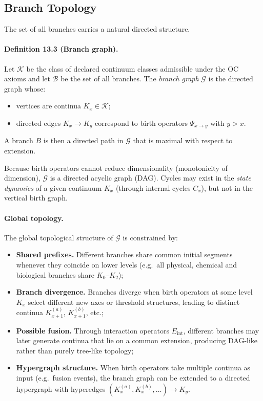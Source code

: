 \subsection{Branch Topology}

The set of all branches carries a natural directed structure.

\paragraph{Definition 13.3 (Branch graph).}
Let \(\mathcal{K}\) be the class of declared continuum classes admissible under the OC
axioms and let \(\mathcal{B}\) be the set of all branches. The
\emph{branch graph} \(\mathcal{G}\) is the directed graph whose:
\begin{itemize}
  \item vertices are continua \(K_x\in\mathcal{K}\);
  \item directed edges \(K_x \to K_y\) correspond to birth operators
        \(\Psi_{x\to y}\) with \(y > x\).
\end{itemize}
A branch \(B\) is then a directed path in \(\mathcal{G}\) that is maximal
with respect to extension.

Because birth operators cannot reduce dimensionality (monotonicity of
dimension), \(\mathcal{G}\) is a directed acyclic graph (DAG). Cycles may
exist in the \emph{state dynamics} of a given continuum \(K_x\) (through
internal cycles \(C_x\)), but not in the vertical birth graph.

\paragraph{Global topology.}
The global topological structure of \(\mathcal{G}\) is constrained by:
\begin{itemize}
  \item \textbf{Shared prefixes.}\quad
        Different branches share common initial segments whenever they
        coincide on lower levels (e.g.\ all physical, chemical and
        biological branches share \(K_0\)–\(K_2\));
  \item \textbf{Branch divergence.}\quad
        Branches diverge when birth operators at some level \(K_x\) select
        different new axes or threshold structures, leading to distinct
        continua \(K_{x+1}^{(a)}\), \(K_{x+1}^{(b)}\), etc.;
  \item \textbf{Possible fusion.}\quad
        Through interaction operators \(E_{\mathrm{int}}\), different
        branches may later generate continua that lie on a common extension,
        producing DAG-like rather than purely tree-like topology;
  \item \textbf{Hypergraph structure.}\quad
        When birth operators take multiple continua as input (e.g.\ fusion
        events), the branch graph can be extended to a directed hypergraph
        with hyperedges
        \((K_{x}^{(a)}, K_{x}^{(b)},\dots) \to K_{y}\).
\end{itemize}

